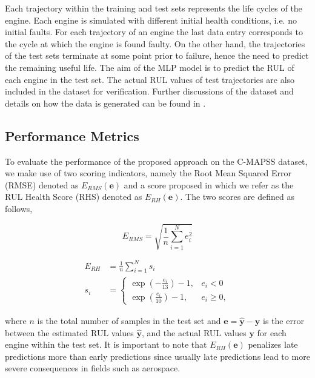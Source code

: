 \documentclass[preprint,12pt]{elsarticle}%
\begin{document}
Each trajectory within the training and test sets represents the life cycles of the engine. Each engine is simulated with different initial health conditions, i.e. no initial faults. For each trajectory of an engine the last data entry corresponds to the cycle at which the engine is found faulty. On the other hand, the trajectories of the test sets terminate at some point prior to failure, hence the need to predict the remaining useful life. The aim of the MLP model is to predict the RUL of each engine in the test set. The actual RUL values of test trajectories are also included in the dataset for verification. Further discussions of the dataset and details on how the data is generated can be found in \cite{Saxena2008}.

\subsection{Performance Metrics}

\label{sec:rul_metrics}

To evaluate the performance of the proposed approach on the C-MAPSS dataset, we make use of two scoring indicators, namely the Root Mean Squared Error (RMSE) denoted as $E_{\scriptscriptstyle RMS}(\mathbf{e})$ and a score proposed in \cite{Saxena2008} which we refer as the RUL Health Score (RHS) denoted as $E_{\scriptscriptstyle RH}(\mathbf{e})$. The two scores are defined as follows,

\begin{equation}
E_{\scriptscriptstyle RMS} = \sqrt{ \frac{1}{n} \sum_{i=1}^{N}{e_{i}^{2}}} \label{eq:rmse}%
\end{equation}
%

\begin{align}
E_{\scriptscriptstyle RH}  &  = \frac{1}{n} \sum_{i=1}^{N}{s_{i}}\nonumber\\
s_{i}  &  =
\begin{cases}
\exp(-\frac{e_{i}}{13}) - 1, & e_{i} < 0\\
\exp(\frac{e_{i}}{10}) - 1, & e_{i} \geq0,
\end{cases}
\label{eq:rhs}%
\end{align}

where $n$ is the total number of samples in the test set and $\mathbf{e} = \mathbf{\hat{y}} - \mathbf{y}$ is the error between the estimated RUL values $\mathbf{\hat{y}}$, and the actual RUL values $\mathbf{y}$ for each engine within the test set. It is important to note that $E_{\scriptscriptstyle RH}(\mathbf{e})$ penalizes late predictions more than early predictions since usually late predictions lead to more severe consequences in fields such as aerospace.
\end{document}
